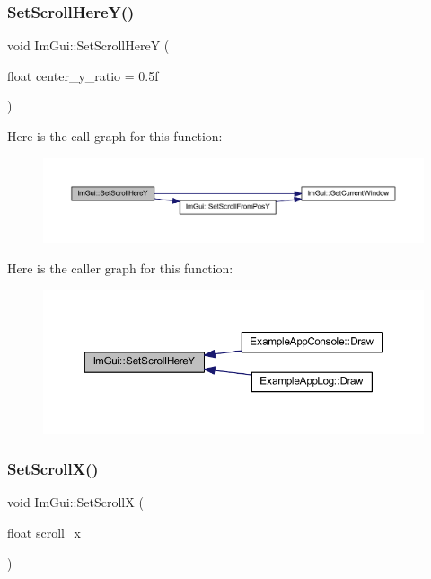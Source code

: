 \subsubsection{\texorpdfstring{Set\+Scroll\+Here\+Y()}{SetScrollHereY()}}
{\footnotesize\ttfamily void Im\+Gui\+::\+Set\+Scroll\+HereY (\begin{DoxyParamCaption}\item[{float}]{center\+\_\+y\+\_\+ratio = {\ttfamily 0.5f} }\end{DoxyParamCaption})}

Here is the call graph for this function\+:
\nopagebreak
\begin{figure}[H]
\begin{center}
\leavevmode
\includegraphics[width=350pt]{namespace_im_gui_ac74487b4d75580ca637659103fef1368_cgraph}
\end{center}
\end{figure}
Here is the caller graph for this function\+:
\nopagebreak
\begin{figure}[H]
\begin{center}
\leavevmode
\includegraphics[width=350pt]{namespace_im_gui_ac74487b4d75580ca637659103fef1368_icgraph}
\end{center}
\end{figure}
\mbox{\label{namespace_im_gui_a0796750de8c50555d895f63e79ac87f0}} 
\subsubsection{\texorpdfstring{Set\+Scroll\+X()}{SetScrollX()}}
{\footnotesize\ttfamily void Im\+Gui\+::\+Set\+ScrollX (\begin{DoxyParamCaption}\item[{float}]{scroll\+\_\+x }\end{DoxyParamCaption})}

